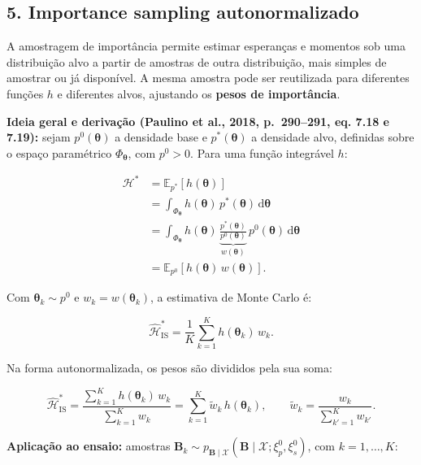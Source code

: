 \documentclass[11pt]{article}
\begin{document}
\subsection{5. Importance sampling
autonormalizado}\label{importance-sampling-autonormalizado}

A amostragem de importância permite estimar esperanças e momentos sob
uma distribuição alvo a partir de amostras de outra distribuição, mais
simples de amostrar ou já disponível. A mesma amostra pode ser
reutilizada para diferentes funções \(h\) e diferentes alvos, ajustando
os \textbf{pesos de importância}.

\textbf{Ideia geral e derivação (Paulino et al., 2018, p.~290--291, eq.
7.18 e 7.19):} sejam \(p^{0}(\boldsymbol{\theta})\) a densidade base e
\(p^{\ast}(\boldsymbol{\theta})\) a densidade alvo, definidas sobre o
espaço paramétrico \(\Phi_{\boldsymbol{\theta}}\), com \(p^{0}>0\). Para
uma função integrável \(h\):

\[\begin{aligned}
\mathcal{H}^{\ast}
&= \mathbb{E}_{p^{\ast}}[h(\boldsymbol{\theta})] \\
&= \int_{\Phi_{\boldsymbol{\theta}}} h(\boldsymbol{\theta})\,p^{\ast}(\boldsymbol{\theta})\,\mathrm{d}\boldsymbol{\theta} \\
&= \int_{\Phi_{\boldsymbol{\theta}}} h(\boldsymbol{\theta})\,\underbrace{\frac{p^{\ast}(\boldsymbol{\theta})}{p^{0}(\boldsymbol{\theta})}}_{w(\boldsymbol{\theta})}\,p^{0}(\boldsymbol{\theta})\,\mathrm{d}\boldsymbol{\theta} \\
&= \mathbb{E}_{p^{0}}[h(\boldsymbol{\theta})\,w(\boldsymbol{\theta})].
\end{aligned}\]

Com \(\boldsymbol{\theta}_k \sim p^{0}\) e
\(w_k = w(\boldsymbol{\theta}_k)\), a estimativa de Monte Carlo é:

\[\widehat{\mathcal{H}}^{\ast}_{\mathrm{IS}} = \frac{1}{K}\sum_{k=1}^{K} h(\boldsymbol{\theta}_k)\,w_k.\]

Na forma autonormalizada, os pesos são divididos pela sua soma:

\[\widehat{\mathcal{H}}^{\ast}_{\mathrm{IS}}
= \frac{\sum_{k=1}^{K} h(\boldsymbol{\theta}_k)\,w_k}{\sum_{k=1}^{K} w_k}
= \sum_{k=1}^{K} \tilde{w}_k\, h(\boldsymbol{\theta}_k),
\qquad
\tilde{w}_k = \frac{w_k}{\sum_{k'=1}^{K} w_{k'}}.\]

\textbf{Aplicação ao ensaio:} amostras
\(\mathbf{B}_k \sim p_{\mathbf{B}\mid\mathcal{X}}(\mathbf{B}\mid\mathcal{X};\xi_p^{0},\xi_s^{0})\),
com \(k=1,\dots,K\):
\end{document}
